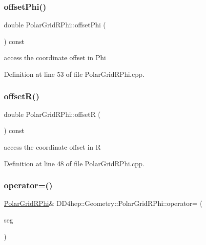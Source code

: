\subsubsection{\texorpdfstring{offset\+Phi()}{offsetPhi()}}
{\footnotesize\ttfamily double Polar\+Grid\+R\+Phi\+::offset\+Phi (\begin{DoxyParamCaption}{ }\end{DoxyParamCaption}) const}



access the coordinate offset in Phi 



Definition at line 53 of file Polar\+Grid\+R\+Phi.\+cpp.

\hypertarget{class_d_d4hep_1_1_geometry_1_1_polar_grid_r_phi_a26a73edbc1c84b1f6bcbb37a8b699020}{}\label{class_d_d4hep_1_1_geometry_1_1_polar_grid_r_phi_a26a73edbc1c84b1f6bcbb37a8b699020} 
\subsubsection{\texorpdfstring{offset\+R()}{offsetR()}}
{\footnotesize\ttfamily double Polar\+Grid\+R\+Phi\+::offsetR (\begin{DoxyParamCaption}{ }\end{DoxyParamCaption}) const}



access the coordinate offset in R 



Definition at line 48 of file Polar\+Grid\+R\+Phi.\+cpp.

\hypertarget{class_d_d4hep_1_1_geometry_1_1_polar_grid_r_phi_a73997fc60dc8ba576bf87ed28807407f}{}\label{class_d_d4hep_1_1_geometry_1_1_polar_grid_r_phi_a73997fc60dc8ba576bf87ed28807407f} 
\subsubsection{\texorpdfstring{operator=()}{operator=()}}
{\footnotesize\ttfamily \hyperlink{class_d_d4hep_1_1_geometry_1_1_polar_grid_r_phi}{Polar\+Grid\+R\+Phi}\& D\+D4hep\+::\+Geometry\+::\+Polar\+Grid\+R\+Phi\+::operator= (\begin{DoxyParamCaption}\item[{const \hyperlink{class_d_d4hep_1_1_geometry_1_1_polar_grid_r_phi}{Polar\+Grid\+R\+Phi} \&}]{seg }\end{DoxyParamCaption})\hspace{0.3cm}{\ttfamily [default]}}



